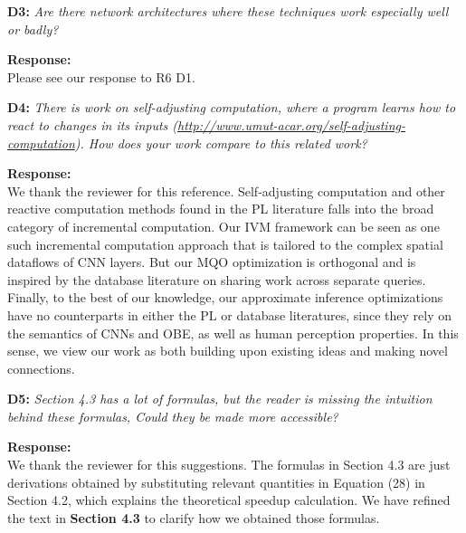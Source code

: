 \documentclass[preprint]{vldb}
\begin{document}
\vspace{2mm}
\noindent \textbf{D3:} \textit{Are there network architectures where these techniques work especially well or badly?}

\vspace{2mm}
\noindent \textbf{Response:}\\
Please see our response to R6 D1.

\vspace{2mm}
\begin{sloppypar}
\noindent \textbf{D4:} \textit{There is work on self-adjusting computation, where a program learns how to react to changes in its inputs (\url{http://www.umut-acar.org/self-adjusting-computation}).
How does your work compare to this related work?}
\end{sloppypar}

\vspace{2mm}
\noindent \textbf{Response:}\\
We thank the reviewer for this reference. Self-adjusting computation and other reactive computation methods found in the PL literature falls into the broad category of incremental computation. Our IVM framework can be seen as one such incremental computation approach that is tailored to the complex spatial dataflows of CNN layers. But our MQO optimization is orthogonal and is inspired by the database literature on sharing work across separate queries. Finally, to the best of our knowledge, our approximate inference optimizations have no counterparts in either the PL or database literatures, since they rely on the semantics of CNNs and OBE, as well as human perception properties. In this sense, we view our work as both building upon existing ideas and making novel connections.

\vspace{2mm}
\noindent \textbf{D5:} \textit{Section 4.3 has a lot of formulas, but the reader is missing the intuition behind these formulas, Could they be made more accessible?}

\vspace{2mm}
\noindent \textbf{Response:}\\
We thank the reviewer for this suggestions. The formulas in Section 4.3 are just derivations obtained by substituting relevant quantities in Equation (28) in Section 4.2, which explains the theoretical speedup calculation. We have refined the text in \textbf{Section 4.3} to clarify how we obtained those formulas.
\end{document}
